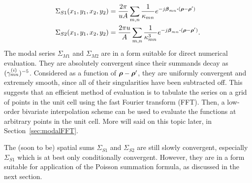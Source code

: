 \begin{align}
  \Sigma_{S1}(x_1,y_1,x_2,y_2)  &= 
  \frac{2\pi}{uA}
  \sum_{m,n} 
    \frac{1}{\kappa_{mn}}
  e^{-j\boldsymbol{\beta}_{mn} \boldsymbol{\cdot} (\boldsymbol{\rho}-\boldsymbol{\rho}')}
  \\
  \Sigma_{S2}(x_1,y_1,x_2,y_2)  &= 
  \frac{2\pi u}{A}
  \sum_{m,n}
  \frac{1}{\kappa_{mn}^3}
  e^{-j\boldsymbol{\beta}_{mn} \boldsymbol{\cdot} (\boldsymbol{\rho}-\boldsymbol{\rho}')}.
\end{align}
The modal series $\Sigma_{M1}$ and $\Sigma_{M2}$ are in a form
suitable for direct numerical evaluation.  They are absolutely
convergent since their summands decay as
$(\gamma^{(i)}_{mn})^{-5}$.  Considered as a function of
$\boldsymbol{\rho}-\boldsymbol{\rho}'$, they are uniformly convergent and
extremely smooth, since all of their
singularities have been subtracted off.  This suggests that an
efficient method of evaluation is to tabulate the series on a grid of
points in the unit cell using the fast Fourier transform (FFT).  Then,
a low-order bivariate interpolation scheme can be used to evaluate the
functions at arbitrary points in the unit cell.  More will said on
this topic later, in Section~\ref{sec:modalFFT}.

The (soon to be) spatial sums $\Sigma_{S1}$ and $\Sigma_{S2}$ are still slowly
convergent, especially $\Sigma_{S1}$ which is at best only
conditionally convergent.  However, they are in a form suitable for
application of the Poisson summation formula, as discussed in the next section.


